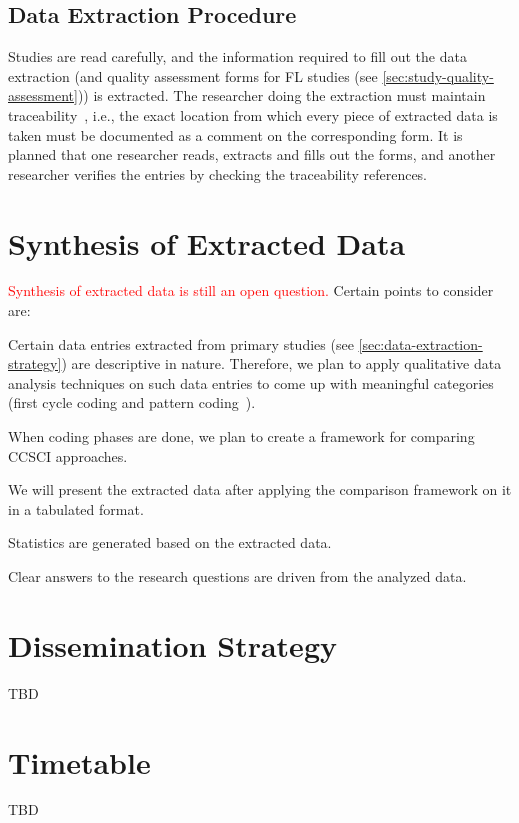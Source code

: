 \documentclass[review]{elsarticle}
\begin{document}
\subsection{Data Extraction Procedure}
Studies are read carefully, and the information required to fill out the data extraction (and quality assessment forms for FL studies (see \cref{sec:study-quality-assessment})) is extracted.
The researcher doing the extraction must maintain traceability~\cite{Garousi2017MLR}, i.e., the exact location from which every piece of extracted data is taken must be documented as a comment on the corresponding form.
It is planned that one researcher reads, extracts and fills out the forms, and another researcher verifies the entries by checking the traceability references.

\section{Synthesis of Extracted Data}
\label{sec:synthesis-of-extracted-data}
\textcolor{red}{Synthesis of extracted data is still an open question.}
Certain points to consider are:
\begin{list}{-}{}
	\item Certain data entries extracted from primary studies (see \cref{sec:data-extraction-strategy}) are descriptive in nature.
	Therefore, we plan to apply qualitative data analysis techniques on such data entries to come up with meaningful categories (first cycle coding and pattern coding~\cite{Miles2014QualitativeDataAnalysis}).
	\item When coding phases are done, we plan to create a framework for comparing CCSCI approaches.
	\item We will present the extracted data after applying the comparison framework on it in a tabulated format.
	\item Statistics are generated based on the extracted data.
	\item Clear answers to the research questions are driven from the analyzed data.
\end{list}

\section{Dissemination Strategy}
\label{sec:dissemination-strategy}
TBD

\section{Timetable}
\label{sec:timetable}
TBD


\end{document}
